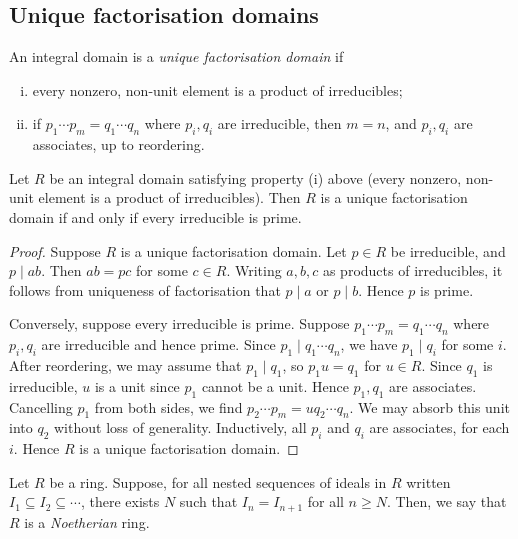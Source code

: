 \subsection{Unique factorisation domains}
\begin{definition}
	An integral domain is a \textit{unique factorisation domain} if
	\begin{enumerate}[(i)]
		\item every nonzero, non-unit element is a product of irreducibles;
		\item if \( p_1 \cdots p_m = q_1 \cdots q_n \) where \( p_i, q_i \) are irreducible, then \( m = n \), and \( p_i, q_i \) are associates, up to reordering.
	\end{enumerate}
\end{definition}
\begin{proposition}
	Let \( R \) be an integral domain satisfying property (i) above (every nonzero, non-unit element is a product of irreducibles).
	Then \( R \) is a unique factorisation domain if and only if every irreducible is prime.
\end{proposition}
\begin{proof}
	Suppose \( R \) is a unique factorisation domain.
	Let \( p \in R \) be irreducible, and \( p \mid ab \).
	Then \( ab = pc \) for some \( c \in R \).
	Writing \( a, b, c \) as products of irreducibles, it follows from uniqueness of factorisation that \( p \mid a \) or \( p \mid b \).
	Hence \( p \) is prime.

	Conversely, suppose every irreducible is prime.
	Suppose \( p_1 \cdots p_m = q_1 \cdots q_n \) where \( p_i, q_i \) are irreducible and hence prime.
	Since \( p_1 \mid q_1 \cdots q_n \), we have \( p_1 \mid q_i \) for some \( i \).
	After reordering, we may assume that \( p_1 \mid q_1 \), so \( p_1 u = q_1 \) for \( u \in R \).
	Since \( q_1 \) is irreducible, \( u \) is a unit since \( p_1 \) cannot be a unit.
	Hence \( p_1, q_1 \) are associates.
	Cancelling \( p_1 \) from both sides, we find \( p_2 \cdots p_m = u q_2 \cdots q_n \).
	We may absorb this unit into \( q_2 \) without loss of generality.
	Inductively, all \( p_i \) and \( q_i \) are associates, for each \( i \).
	Hence \( R \) is a unique factorisation domain.
\end{proof}
\begin{definition}
	Let \( R \) be a ring.
	Suppose, for all nested sequences of ideals in \( R \) written \( I_1 \subseteq I_2 \subseteq \cdots \), there exists \( N \) such that \( I_n = I_{n+1} \) for all \( n \geq N \).
	Then, we say that \( R \) is a \textit{Noetherian} ring.
\end{definition}
